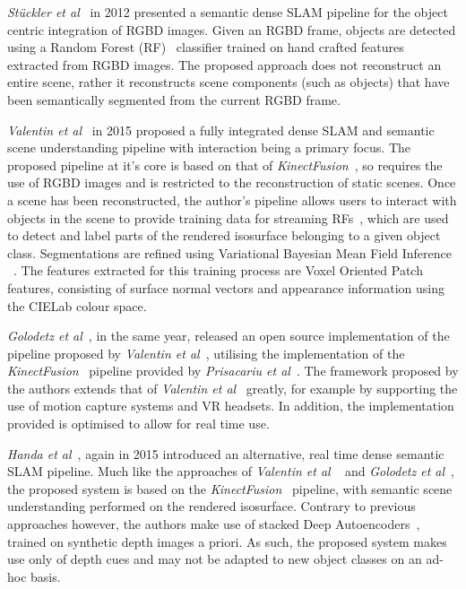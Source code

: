 \textit{St{\"u}ckler et al}~\cite{Stuckler2012} in 2012 presented a semantic dense SLAM 
pipeline for the object centric integration of RGBD images. Given an RGBD frame, objects 
are detected using a Random Forest (RF)~\cite{Ho1995} classifier trained on hand crafted features 
extracted from RGBD images. The proposed approach does not reconstruct an entire scene, rather it 
reconstructs scene components (such as objects) that have been semantically segmented 
from the current RGBD frame.

\textit{Valentin et al}~\cite{Valentin2015} in 2015 proposed a fully integrated dense SLAM 
and semantic scene understanding pipeline with interaction being a primary focus. The 
proposed pipeline at it's core is based on that of \textit{KinectFusion}~\cite{Newcombe2011}, 
so requires the use of RGBD images and is restricted to the reconstruction of static scenes. 
Once a scene has been reconstructed, the author's pipeline allows users to interact with 
objects in the scene to provide training data for streaming RFs~\cite{Abdulsalam2007}, 
which are used to detect and label parts of the rendered isosurface belonging to a given 
object class. Segmentations are refined using Variational Bayesian Mean Field Inference 
~\cite{Xing2002, Krahenbuhl2011}. The features extracted for this training 
process are Voxel Oriented Patch features, consisting of surface normal vectors
and appearance information using the CIELab colour space.

\textit{Golodetz et al}~\cite{Golodetz2015}, in the same year, released an open source 
implementation of the pipeline proposed by \textit{Valentin et al}~\cite{Valentin2015}, 
utilising the implementation of the \textit{KinectFusion}~\cite{Newcombe2011} pipeline 
provided by \textit{Prisacariu et al}~\cite{Prisacariu2014}. The framework proposed by 
the authors extends that of \textit{Valentin et al}~\cite{Valentin2015} greatly, for 
example by supporting the use of motion capture systems and VR headsets. 
In addition, the implementation provided is optimised to allow for real time use.

\textit{Handa et al}~\cite{Handa2015}, again in 2015 introduced an alternative, 
real time dense semantic SLAM pipeline. Much like the approaches of \textit{Valentin et al} 
~\cite{Valentin2015} and \textit{Golodetz et al}~\cite{Golodetz2015}, the proposed system 
is based on the \textit{KinectFusion}~\cite{Newcombe2011} pipeline, with semantic scene 
understanding performed on the rendered isosurface. Contrary to previous approaches however, 
the authors make use of stacked Deep Autoencoders~\cite{Liou2008}, trained on synthetic depth 
images a priori. As such, the proposed system makes use only of depth cues and may not be 
adapted to new object classes on an ad-hoc basis.

